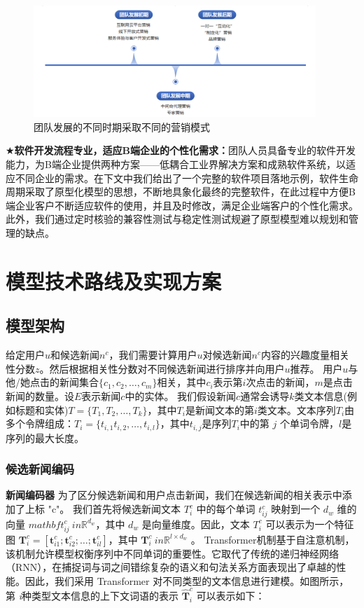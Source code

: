 \documentclass[withoutpreface,bwprint]{cumcmthesis} %
\begin{document}
	\begin{figure}[H]
		\includegraphics[width=0.95\textwidth]{营销发展}
		\caption{团队发展的不同时期采取不同的营销模式}
		\label{fig:circuit-diagcam}
	\end{figure}
	$\bigstar$\textbf{软件开发流程专业，适应B端企业的个性化需求：}团队人员具备专业的软件开发能力，为B端企业提供两种方案——低耦合工业界解决方案和成熟软件系统，以适应不同企业的需求。在下文中我们给出了一个完整的软件项目落地示例，软件生命周期采取了原型化模型的思想，不断地具象化最终的完整软件，在此过程中方便B端企业客户不断适应软件的使用，并且及时修改，满足企业端客户的个性化需求。此外，我们通过定时核验的兼容性测试与稳定性测试规避了原型模型难以规划和管理的缺点。\par
	\newpage
	\section{模型技术路线及实现方案}
	\subsection{模型架构}
	给定用户$u$和候选新闻$n^c$，我们需要计算用户$u$对候选新闻$n^c$内容的兴趣度量相关性分数$z$。然后根据相关性分数对不同候选新闻进行排序并向用户$u$推荐。
	用户$u$与他/她点击的新闻集合$\{ c_1, c_2, \dots, c_m\} $相关，其中$c_i$表示第$i$次点击的新闻，$m$是点击新闻的数量。设$E$表示新闻$c$中的实体。
	我们假设新闻$c$通常会诱导$k$类文本信息(例如标题和实体)$T = \{ T_1, T_2,\dots, T_k\} $，其中$T_i$是新闻文本的第$i$类文本。文本序列$T_i$由多个令牌组成：$T_i = \{ t_{ i,1}  t_{ i,2}  ,\dots, t_{ i,l} \} $，其中$t_{ i,j} $是序列$T_i$中的第{ $j$} 个单词令牌，$l$是序列的最大长度。
	\subsubsection{ 候选新闻编码}
	\textbf{新闻编码器 } 
	为了区分候选新闻和用户点击新闻，我们在候选新闻的相关表示中添加了上标 "c"。
	我们首先将候选新闻文本 $T_i^c$ 中的每个单词 $t^c_{ij}$ 映射到一个 $d_w$ 维的向量 $mathbf{t}_{ij}^c \ in \mathbb{R}^{d_w}$，其中 $d_w$ 是向量维度。因此，文本 $T_i^c$ 可以表示为一个特征图 $\mathbf{T}_i^c = [\mathbf{t}_{i1}^c; \mathbf{t}_{i2}^c; \dots; \mathbf{t}_{il}^c]$，其中 $\mathbf{T}_i^c \ in \mathbb{R}^{l \times d_w}$ 。
	Transformer机制基于自注意机制，该机制允许模型权衡序列中不同单词的重要性。它取代了传统的递归神经网络（RNN），在捕捉词与词之间错综复杂的语义和句法关系方面表现出了卓越的性能。因此，我们采用 Transformer 对不同类型的文本信息进行建模。如图所示，第 \textit{i}种类型文本信息的上下文词语的表示 $\hat{\mathbf{T}}_i^c$ 可以表示如下：
	
\end{document}
